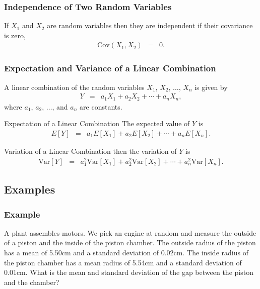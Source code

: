 \begin{frame}
  \frametitle{Independence of Two Random Variables}

  \begin{definition}
    If $X_1$ and $X_2$ are random variables then they are independent
    if their covariance is zero,
    \begin{eqnarray*}
      \mathrm{Cov}(X_1,X_2) & = & 0.
    \end{eqnarray*}
  \end{definition}
  
\end{frame}

\begin{frame}
  \frametitle{Expectation and Variance of a Linear Combination}

  A linear combination of the random variables $X_1$, $X_2$, $\ldots$,
  $X_n$ is given by
  \begin{eqnarray*}
    Y & = & a_1 X_1 + a_2 X_2 + \cdots + a_n X_n,
  \end{eqnarray*}
  where $a_1$, $a_2$, $\ldots$, and $a_n$ are constants.


  \begin{block}{Expectation of a Linear Combination}
    The expected value of $Y$ is 
    \begin{eqnarray*}
      E[Y] & = & a_1 E[X_1] + a_2 E[X_2] + \cdots + a_n E[X_n].
    \end{eqnarray*}
  \end{block}

  \begin{block}{Variation of a Linear Combination}
     then the
    variation of $Y$ is
    \begin{eqnarray*}
      \mathrm{Var}[Y] & = & a_1^2 \mathrm{Var}[X_1] + a_2^2 \mathrm{Var}[X_2] + \cdots + a_n^2 \mathrm{Var}[X_n].
    \end{eqnarray*}

  \end{block}

  
\end{frame}


\subsection{Examples}

\begin{frame}
  \frametitle{Example}
  A plant assembles motors. We pick an engine at random and measure
  the outside of a piston and the inside of the piston chamber. The
  outside radius of the piston has a mean of 5.50cm and a standard
  deviation of 0.02cm. The inside radius of the piston chamber has a
  mean radius of 5.54cm and a standard deviation of 0.01cm. What is
  the mean and standard deviation of the gap between the piston and
  the chamber?
\end{frame}


